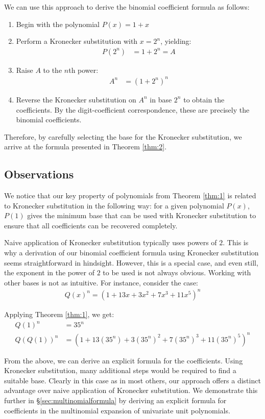 \documentclass{article}
\theoremstyle{plain}
\theoremstyle{definition}
\begin{document}
We can use this approach to derive the binomial coefficient formula as follows:
\begin{enumerate}
    \item Begin with the polynomial $P(x) = 1 + x$
    \item Perform a Kronecker substitution with $x = 2^{n}$, yielding:
    \begin{align}
    P(2^{n}) &= 1 + 2^{n} = A
    \end{align}
    \item Raise $A$ to the $n$th power:
    \begin{align}
    A^n &= (1 + 2^n)^n
    \end{align}
    \item Reverse the Kronecker substitution on $A^n$ in base $2^n$ to obtain the coefficients. By the digit-coefficient correspondence, these are precisely the binomial coefficients.
\end{enumerate}
Therefore, by carefully selecting the base for the Kronecker substitution, we arrive at the formula presented in Theorem \ref{thm:2}.

\subsection{Observations}
We notice that our key property of polynomials from Theorem \ref{thm:1} is related to Kronecker substitution in the following way: for a given polynomial $P(x)$, $P(1)$ gives the minimum base that can be used with Kronecker substitution to ensure that all coefficients can be recovered completely.

Naive application of Kronecker substitution typically uses powers of \(2\). This is why a derivation of our binomial coefficient formula using Kronecker substitution seems straightforward in hindsight. However, this is a special case, and even still, the exponent in the power of \(2\) to be used is not always obvious. Working with other bases is not as intuitive. For instance, consider the case:
\begin{align}
    Q(x)^n = (1 + 13x + 3x^2 + 7x^3 + 11x^5)^n
\end{align}

Applying Theorem \ref{thm:1}, we get:
\begin{align}
    Q(1)^n &= 35^n \\
    Q(Q(1))^n &= (1 + 13(35^n) + 3(35^n)^2 + 7(35^n)^3 + 11(35^n)^5)^n
\end{align}

From the above, we can derive an explicit formula for the coefficients. Using Kronecker substitution, many additional steps would be required to find a suitable base. Clearly in this case as in most others, our approach offers a distinct advantage over naive application of Kronecker substitution. We demonstrate this further in \S \ref{sec:multinomialformula} by deriving an explicit formula for coefficients in the multinomial expansion of univariate unit polynomials.
\end{document}
